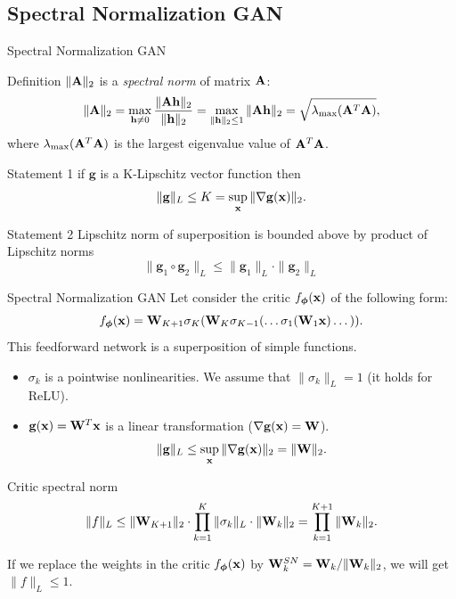 \documentclass{beamer}
\begin{document}
\subsection{Spectral Normalization GAN}
\begin{frame}{Spectral Normalization GAN}
	\begin{block}{Definition}
		$\| \mathbf{A} \|_2$ is a \textit{spectral norm} of matrix $\mathbf{A}$:
		\[
			\| \mathbf{A} \|_2 = \max_{\mathbf{h} \neq 0} \frac{\|\mathbf{A} \mathbf{h}\|_2}{\|\mathbf{h}\|_2} = \max_{\|\mathbf{h}\|_2 \leq 1} \| \mathbf{A} \mathbf{h} \|_2 = \sqrt{\lambda_{\text{max}}(\mathbf{A}^T \mathbf{A})},
		\]
		where $\lambda_{\text{max}}(\mathbf{A}^T \mathbf{A})$ is the largest eigenvalue value of $\mathbf{A}^T \mathbf{A}$.
	\end{block}
	\begin{block}{Statement 1}
		if $\mathbf{g}$ is a K-Lipschitz vector function then 
		\[
			\| \mathbf{g} \|_L \leq K = \sup_{\mathbf{x}} \| \nabla \mathbf{g}(\mathbf{x}) \|_2.
		\]
		\vspace{-0.7cm}
	\end{block}
	\begin{block}{Statement 2}
		Lipschitz norm of superposition is bounded above by product of Lipschitz norms
		\vspace{-0.2cm}
		\[
			\| \mathbf{g}_1 \circ \mathbf{g}_2 \|_L \leq \| \mathbf{g}_1 \|_L \cdot \| \mathbf{g}_2\|_L
		\]
	\end{block}
\end{frame}
\begin{frame}{Spectral Normalization GAN}
	Let consider the critic $f_{\boldsymbol{\phi}}(\mathbf{x})$ of the following form:
	\[
		f_{\boldsymbol{\phi}}(\mathbf{x}) = \mathbf{W}_{K+1} \sigma_K (\mathbf{W}_K \sigma_{K-1}(\dots \sigma_1(\mathbf{W}_1 \mathbf{x}) \dots)).
	\]
	This feedforward network is a superposition of simple functions.
	\begin{itemize}
		\item $\sigma_k$ is a pointwise nonlinearities. We assume that $\| \sigma_k \|_L = 1$ (it holds for ReLU).
		\item $\mathbf{g}(\mathbf{x}) = \mathbf{W}^T \mathbf{x}$ is a linear transformation ($\nabla \mathbf{g}(\mathbf{x}) = \mathbf{W}$).
		\[
			\| \mathbf{g} \|_L \leq \sup_{\mathbf{x}} \| \nabla \mathbf{g}(\mathbf{x})\|_2 = \| \mathbf{W} \|_2.
		\]
	\end{itemize}
	\vspace{-0.4cm}
	\begin{block}{Critic spectral norm}
		\vspace{-0.4cm}
		\[
			\| f \|_L \leq \| \mathbf{W}_{K+1}\|_2 \cdot \prod_{k=1}^K  \| \sigma_k \|_L \cdot \| \mathbf{W}_k \|_2 = \prod_{k=1}^{K+1} \|\mathbf{W}_k\|_2.
		\]
		\vspace{-0.2cm}
	\end{block}
	If we replace the weights in the critic $f_{\boldsymbol{\phi}}(\mathbf{x})$ by $\mathbf{W}^{SN}_k = \mathbf{W}_k / \|\mathbf{W}_k\|_2$, we will get $\| f\|_L \leq 1.$ \\
	
\end{frame}
\end{document}
